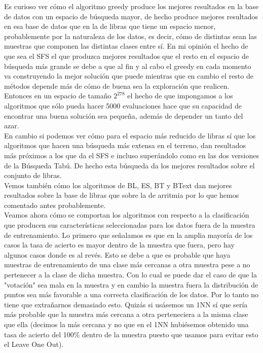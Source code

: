 \documentclass[10pt,a4paper]{article}
\begin{document}
Es curioso ver cómo el algoritmo greedy produce los mejores resultados en la base de datos con un espacio de búsqueda mayor, de hecho produce mejores resultados en esa base de datos que en la de libras que tiene un espacio menor, probablemente por la naturaleza de los datos, es decir, cómo de distintas sean las muestras que componen las distintas clases entre sí. En mi opinión el hecho de que sea el SFS el que produzca mejores resultados que el resto en el espacio de búsqueda más grande se debe a que al fin y al cabo el greedy en cada momento va construyendo la mejor solución que puede mientras que en cambio el resto de métodos depende más de cómo de buena sea la exploración que realicen. Entonces en un espacio de tamaño $2^{278}$ el hecho de que impongamos a los algoritmos que sólo pueda hacer 5000 evaluaciones hace que su capacidad de encontrar una buena solución sea pequeña, además de depender un tanto del azar.\\

En cambio si podemos ver cómo para el espacio más reducido de libras sí que los algoritmos que hacen una búsqueda más extensa en el terreno, dan resultados más próximos a los que da el SFS e incluso superándolo como en las dos versiones de la Búsqueda Tabú. De hecho esta búsqueda da los mejores resultados sobre el conjunto de libras.\\

Vemos también cómo los algoritmos de BL, ES, BT y BText dan mejores resultados sobre la base de libras que sobre la de arritmia por lo que hemos comentado antes probablemente.\\


Veamos ahora cómo se comportan los algoritmos con respecto a la clasificación que producen sus características seleccionadas para los datos fuera de la muestra de entrenamiento. Lo primero que señalamos es que en la amplia mayoría de los casos la tasa de acierto es mayor dentro de la muestra que fuera, pero hay algunos casos donde es al revés. Esto se debe a que es probable que haya muestras de entrenamiento de una clase más cercanas a otra muestra pese a no pertenecer a la clase de dicha muestra. Con lo cual se puede dar el caso de que la "votación" sea mala en la muestra y en cambio la muestra fuera la distribución de puntos sea más favorable a una correcta clasificación de los datos. Por lo tanto no tiene que extrañarnos demasiado esto. Quizás si usásemos un 1NN sí que sería más probable que la muestra más cercana a otra perteneciera a la misma clase que ella (decimos la más cercana y no que en el 1NN hubiésemos obtenido una tasa de acierto del 100\% dentro de la muestra puesto que usamos para evitar esto el Leave One Out).\\
\end{document}
